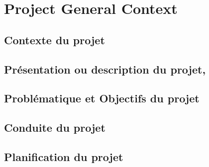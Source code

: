 

\chapter{Project General Context }%
\label{chap:chapter_one}

\section{Contexte du projet}
\section{Présentation ou description du projet,}
\section{Problématique et Objectifs du projet}
\section{Conduite du projet}
\section{Planification du projet}
